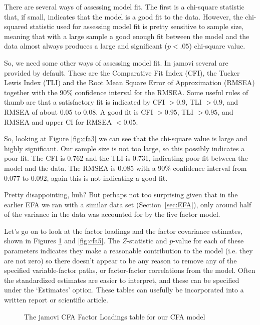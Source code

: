 There are several ways of assessing model fit. The first is a chi-square statistic that, if small, indicates that the model is a good fit to the data. However, the chi-squared statistic used for assessing model fit is pretty sensitive to sample size, meaning that with a large sample a good enough fit between the model and the data almost always produces a large and significant ($p<.05$) chi-square value. 

So, we need some other ways of assessing model fit. In jamovi several are provided by default. These are the Comparative Fit Index (CFI), the Tucker Lewis Index (TLI) and the Root Mean Square Error of Approximation (RMSEA) together with the 90\% confidence interval for the RMSEA. Some useful rules of thumb are that a satisfactory fit is indicated by CFI $>0.9$, TLI $>0.9$, and RMSEA of about $0.05$ to $0.08$. A good fit is CFI $>0.95$, TLI $>0.95$, and RMSEA and upper CI for RMSEA $<0.05$. 

So, looking at Figure \ref{fig:cfa3} we can see that the chi-square value is large and highly significant. Our sample size is not too large, so this possibly indicates a poor fit. The CFI is 0.762 and the TLI is 0.731, indicating poor fit between the model and the data. The RMSEA is 0.085 with a 90\% confidence interval from 0.077 to 0.092, again this is not indicating a good fit.  

Pretty disappointing, huh? But perhaps not too surprising given that in the earlier EFA we ran with a similar data set (Section~\ref{sec:EFA}), only around half of the variance in the data was accounted for by the five factor model. 

Let’s go on to look at the factor loadings and the factor covariance estimates, shown in Figures \ref{fig:cfa4} and \ref{fig:cfa5}. The $Z$-statistic and $p$-value for each of these parameters indicates they make a reasonable contribution to the model (i.e. they are not zero) so there doesn't appear to be any reason to remove any of the specified variable-factor paths, or factor-factor correlations from the model. Often the standardized estimates are easier to interpret, and these can be specified under the ‘Estimates’ option. These tables can usefully be incorporated into a written report or scientific article.

\begin{figure}[!htb]
\begin{center}
\caption{The jamovi CFA Factor Loadings table for our CFA model}
\label{fig:cfa4}
\HR
\end{center}
\end{figure}

